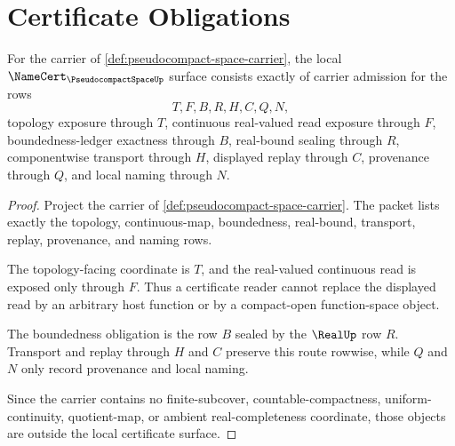 \section{Certificate Obligations}
\label{sec:pseudocompact-space-obligations}

\begin{theorem}
\label{thm:pseudocompact-space-namecert-obligations}
For the carrier of \autoref{def:pseudocompact-space-carrier}, the local $\NameCert_{\PseudocompactSpaceUp}$ surface consists exactly of carrier admission for the rows
$$
T,F,B,R,H,C,Q,N,
$$
topology exposure through $T$, continuous real-valued read exposure through $F$, boundedness-ledger exactness through $B$, real-bound sealing through $R$, componentwise transport through $H$, displayed replay through $C$, provenance through $Q$, and local naming through $N$.
\end{theorem}
\begin{proof}
Project the carrier of \autoref{def:pseudocompact-space-carrier}. The packet lists exactly the topology, continuous-map, boundedness, real-bound, transport, replay, provenance, and naming rows.

The topology-facing coordinate is $T$, and the real-valued continuous read is exposed only through $F$. Thus a certificate reader cannot replace the displayed read by an arbitrary host function or by a compact-open function-space object.

The boundedness obligation is the row $B$ sealed by the $\RealUp$ row $R$. Transport and replay through $H$ and $C$ preserve this route rowwise, while $Q$ and $N$ only record provenance and local naming.

Since the carrier contains no finite-subcover, countable-compactness, uniform-continuity, quotient-map, or ambient real-completeness coordinate, those objects are outside the local certificate surface.
\end{proof}

